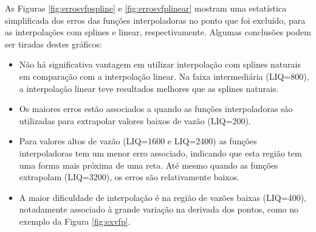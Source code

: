 \documentclass[final,5p]{elsarticle}
\numberwithin{equation}{section}
\begin{document}
                
        
        
        As Figuras \ref{fig:errosvfpspline} e \ref{fig:errosvfplinear} mostram uma estatística simplificada dos erros das funções interpoladoras no ponto que foi excluído, para as interpolações com splines e linear, respectivamente. Algumas conclusões podem ser tiradas destes gráficos:

        \begin{itemize}
            \item Não há significativa vantagem em utilizar interpolação com splines naturais em comparação com a interpolação linear. Na faixa intermediária (LIQ=800), a interpolação linear teve resultados melhores que as splines naturais.
            \item Os maiores erros estão associados a quando as funções interpoladoras são utilizadas para extrapolar valores baixos de vazão (LIQ=200).
            \item Para valores altos de vazão (LIQ=1600 e LIQ=2400) as funções interpoladoras tem um menor erro associado, indicando que esta região tem uma forma mais próxima de uma reta. Até mesmo quando as funções extrapolam (LIQ=3200), os erros são relativamente baixos.
            \item A maior dificuldade de interpolação é na região de vazões baixas (LIQ=400), notadamente associado à grande variação na derivada dos pontos, como no exemplo da Figura \ref{fig:exvfp}.
        \end{itemize}
\end{document}
